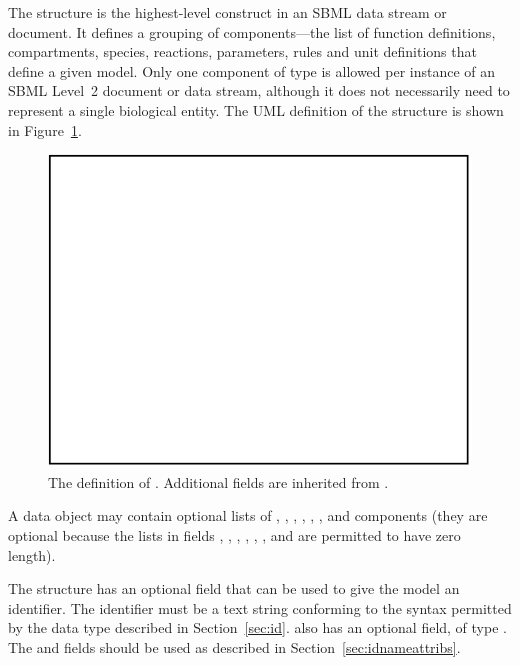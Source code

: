 \documentclass[10pt,twocolumntoc]{cekarticle}
\newcommand{\vref}[1]{\ref{#1}}
\begin{document}
The  structure is the highest-level construct in an SBML data
stream or document.  It defines a grouping of components---the list of
function definitions, compartments, species, reactions, parameters, rules
and unit definitions that define a given model.  Only one component of type
 is allowed per instance of an SBML Level~2 document or data
stream, although it does not necessarily need to represent a single
biological entity.  The UML definition of the  structure is
shown in Figure~\vref{fig:model}.

\begin{figure}[htb]
  \centering
  \includegraphics[scale = 0.68]{model}
  \caption{The definition of .  Additional fields are
    inherited from .}
  \label{fig:model}
\end{figure}

A  data object may contain optional lists of ,
, , ,
, , and  components (they are
optional because the lists in fields ,
, , ,
, , and  are permitted to
have zero length).

The  structure has an optional  field that can be
used to give the model an identifier.  The identifier must be a text string
conforming to the syntax permitted by the  data type described
in Section~\ref{sec:id}.   also has an optional 
field, of type .  The  and  fields
should be used as described in Section~\ref{sec:idnameattribs}.
\end{document}
